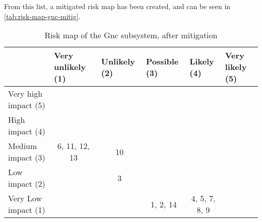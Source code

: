 \noindent From this list, a mitigated risk map has been created, and can be seen in \autoref{tab:risk-map-gnc-mitig}.

\begin{table}[H]
\centering
\caption{Risk map of the Gnc subsystem, after mitigation}
\label{tab:risk-map-gnc-mitig}\begin{tabular}{l|c|c|c|c|c|}
\cline{2-6}
& \multicolumn{1}{l|}{Very unlikely (1)} & \multicolumn{1}{l|}{Unlikely (2)} & \multicolumn{1}{l|}{Possible (3)} & \multicolumn{1}{l|}{Likely (4)} & \multicolumn{1}{l|}{Very likely (5)} \\ \hline
\multicolumn{1}{|l|}{Very high impact (5)} & \cellcolor{rm-3} & \cellcolor{rm-3} & \cellcolor{rm-3} & \cellcolor{rm-3} & \cellcolor{rm-3}\\ \hline 
\multicolumn{1}{|l|}{High impact (4)} & \cellcolor{rm-2} & \cellcolor{rm-2} & \cellcolor{rm-2} & \cellcolor{rm-3} & \cellcolor{rm-3}\\ \hline 
\multicolumn{1}{|l|}{Medium impact (3)} & \cellcolor{rm-0}6, 11, 12, 13 & \cellcolor{rm-1}10 & \cellcolor{rm-1} & \cellcolor{rm-2} & \cellcolor{rm-3}\\ \hline 
\multicolumn{1}{|l|}{Low impact (2)} & \cellcolor{rm-0} & \cellcolor{rm-0}3 & \cellcolor{rm-1} & \cellcolor{rm-2} & \cellcolor{rm-3}\\ \hline 
\multicolumn{1}{|l|}{Very Low impact (1)} & \cellcolor{rm-0} & \cellcolor{rm-0} & \cellcolor{rm-0}1, 2, 14 & \cellcolor{rm-2}4, 5, 7, 8, 9 & \cellcolor{rm-3}\\ \hline 
\end{tabular} 
\end{table}

